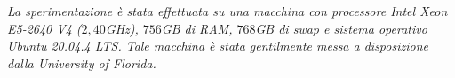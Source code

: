 \newline
\textit{La sperimentazione è stata effettuata su una macchina con processore
  Intel Xeon E5-2640 V4 ($2,40$GHz), $756$GB di RAM, $768$GB di swap e
  sistema operativo Ubuntu 20.04.4 LTS. Tale macchina è stata gentilmente messa
  a disposizione dalla \emph{University of Florida}.}